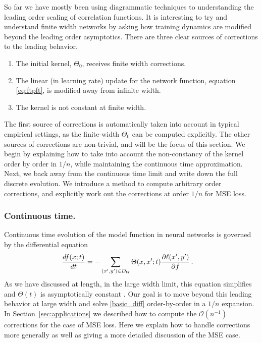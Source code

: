 \documentclass[english]{article}
\newcommand{\es}[2] {\begin{align} \label{#1} #2 \end{align}}
\newcommand{\pcite}[1]{\cite{#1}}
\begin{document}
So far we have mostly been using diagrammatic techniques to understanding the leading order scaling of correlation functions. It is interesting to try and understand finite width networks by asking how training dynamics are modified beyond the leading order asymptotics.
There are three clear sources of corrections to the leading behavior.
\begin{enumerate}
\item The initial kernel, $\Theta_{0}$, receives finite width corrections.
\item The linear (in learning rate) update for the network function, equation \eqref{eq:ftpft}, is modified away from infinite width.
\item The kernel is not constant at finite width. 
\end{enumerate}
The first source of corrections is automatically taken into account in typical empirical settings, as the finite-width $\Theta_0$ can be computed explicitly.
The other sources of corrections are non-trivial, and will be the focus of this section.
We begin by explaining how to take into account the non-constancy of the kernel order by order in $1/n$, while maintaining the continuous time approximation.
Next, we back away from the continuous time limit and write down the full discrete evolution.
We introduce a method to compute arbitrary order corrections, and explicitly work out the corrections at order $1/n$ for MSE loss.
\subsubsection{Continuous time.}
Continuous time evolution of the model function in neural networks is governed by the differential equation
\es{basic_diff}{
\frac{df(x;t)}{dt}&=-\sum_{(x',y')\in D_{\rm tr}}\Theta(x,x';t)\frac{\partial \ell(x',y')}{\partial f}\,.
}
As we have discussed at length, in the large width limit, this equation simplifies and $\Theta(t)$ is asymptotically constant \pcite{ntk}. Our goal is to move beyond this leading behavior at large width and solve \eqref{basic_diff} order-by-order in a $1/n$ expansion.
In Section~\ref{sec:applications} we described how to compute the $\mathcal{O}(n^{-1})$ corrections for the case of MSE loss. Here we explain how to handle corrections more generally as well as giving a more detailed discussion of the MSE case. 
\end{document}
